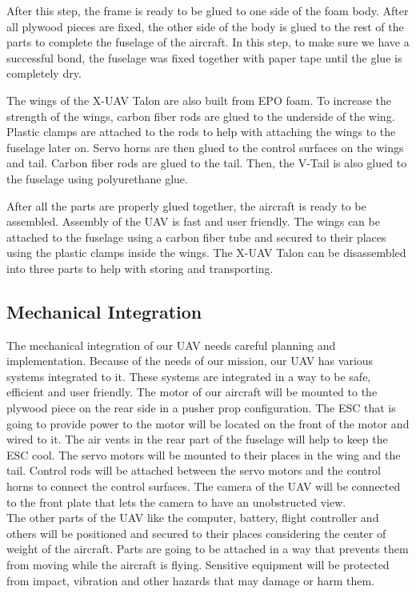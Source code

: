 \documentclass[12pt]{article}
\begin{document}

After this step, the frame is ready to be glued to one side of the foam body. After all plywood pieces are fixed, the other side of the body is glued to the rest of the parts to complete the fuselage of the aircraft. In this step, to make sure we have a successful bond, the fuselage was fixed together with paper tape until the glue is completely dry.

The wings of the X-UAV Talon are also built from EPO foam. To increase the strength of the wings, carbon fiber rods are glued to the underside of the wing. Plastic clamps are attached to the rods to help with attaching the wings to the fuselage later on. Servo horns are then glued to the control surfaces on the wings and tail. Carbon fiber rods are glued to the tail. Then, the V-Tail is also glued to the fuselage using polyurethane glue.

After all the parts are properly glued together, the aircraft is ready to be assembled. Assembly of the UAV is fast and user friendly. The wings can be attached to the fuselage using a carbon fiber tube and secured to their places using the plastic clamps inside the wings. The X-UAV Talon can be disassembled into three parts to help with storing and transporting.


\subsection{Mechanical Integration}
The mechanical integration of our UAV needs careful planning and implementation. Because of the needs of our mission, our UAV has various systems integrated to it. These systems are integrated in a way to be safe, efficient and user friendly. The motor of our aircraft will be mounted to the plywood piece on the rear side in a pusher prop configuration. The ESC that is going to provide power to the motor will be located on the front of the motor and wired to it. The air vents in the rear part of the fuselage will help to keep the ESC cool. The servo motors will be mounted to their places in the wing and the tail. Control rods will be attached between the servo motors and the control horns to connect the control surfaces. The camera of the UAV will be connected to the front plate that lets the camera to have an unobstructed view. \\

The other parts of the UAV like the computer, battery, flight controller and others will be positioned and secured to their places considering the center of weight of the aircraft. Parts are going to be attached in a way that prevents them from moving while the aircraft is flying. Sensitive equipment will be protected from impact, vibration and other hazards that may damage or harm them.\\
\end{document}
